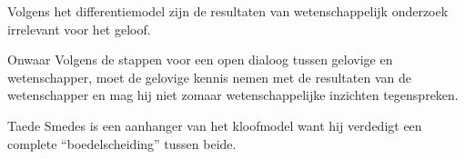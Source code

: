 \documentclass[main.tex]{subfiles}
\begin{document}
\begin{examenvraag}
    \begin{stelling}
        Volgens het differentiemodel zijn de resultaten van wetenschappelijk onderzoek irrelevant voor het geloof.
    \end{stelling}

    \begin{stelling-antwoord}{Onwaar}
    	Volgens de stappen voor een open dialoog tussen gelovige en wetenschapper, moet de gelovige kennis nemen met de resultaten van de wetenschapper en mag hij niet zomaar wetenschappelijke inzichten tegenspreken.
  	\end{stelling-antwoord}
\end{examenvraag}


\begin{examenvraag}
    \begin{stelling}
        Taede Smedes is een aanhanger van het kloofmodel want hij verdedigt een complete “boedelscheiding” tussen beide.
    \end{stelling}

    \begin{antwoord}
    \end{antwoord}
\end{examenvraag}
\end{document}
